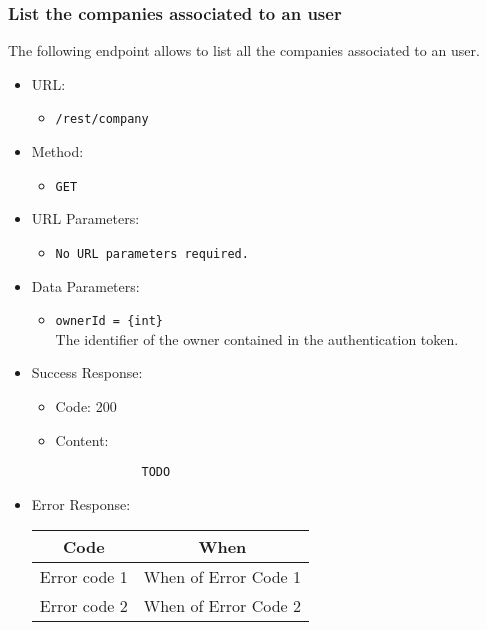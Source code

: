 \subsubsection*{List the companies associated to an user}

The following endpoint allows to list all the companies associated to an user.

\begin{itemize}
    
    \item URL: 
    \begin{itemize}
        \item \texttt{/rest/company}
    \end{itemize}
    
    \item Method: 
    \begin{itemize}
        \item \texttt{GET}
    \end{itemize}
    
    \item URL Parameters: 
    \begin{itemize}
        \item \texttt{No URL parameters required.}
    \end{itemize}
    
    \item Data Parameters: 
    \begin{itemize}
        \item \texttt{ownerId = \{int\}} \\
        The identifier of the owner contained in the authentication token.
    \end{itemize}
    
    \item Success Response: 
    \begin{itemize}
        \item Code: 200
        \item Content:
        \begin{lstlisting}
            TODO
        \end{lstlisting}    
    \end{itemize}
    
    \item Error Response:
    \begin{table}[!h]
    \centering 
    \begin{tabular}{|c|c|}
    \hline
    \multicolumn{1}{|c|}{\textbf{Code}} & \multicolumn{1}{c|}{\textbf{When}} \\ \hline
    Error code 1 & When of Error Code 1 \\\hline
    Error code 2 & When of Error Code 2 \\\hline
    \end{tabular} 
    \end{table} 
    
\end{itemize}


